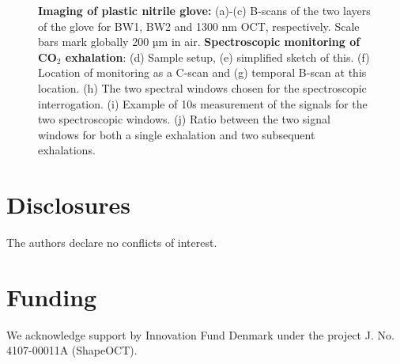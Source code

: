 \documentclass[9pt,twocolumn]{extarticle}
\begin{document}
\begin{figure}[h!]
\centering
{}
\caption{\textbf{Imaging of plastic nitrile glove:}  (a)-(c) B-scans of the two layers of the glove for BW1, BW2 and 1300 nm OCT, respectively. Scale bars mark globally 200 µm in air. \textbf{Spectroscopic monitoring of CO$_2$ exhalation}: (d) Sample setup, (e) simplified sketch of this. (f) Location of monitoring as a C-scan and (g) temporal B-scan at this location. (h) The two spectral windows chosen for the spectroscopic interrogation. (i) Example of 10s measurement of the signals for the two spectroscopic windows. (j) Ratio between the two signal windows for both a single exhalation and two subsequent exhalations.}
\label{Fig4-OCT}
\end{figure}


\section{Disclosures} The authors declare no conflicts of interest.
\section{Funding} We acknowledge support by Innovation Fund Denmark under the project J. No. 4107-00011A (ShapeOCT).
\clearpage




\end{document}
